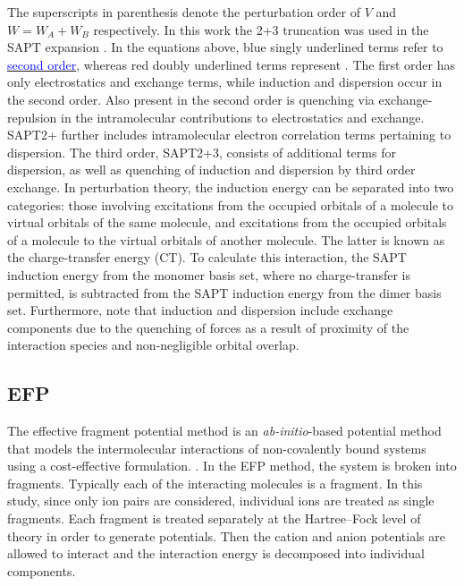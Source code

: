 The superscripts in parenthesis denote the perturbation order of $V$ and $W = W_A + W_B$ respectively. 
In this work the 2+3 truncation was used in the SAPT expansion
\cite{Turney2012a}.
In the equations above, blue singly underlined terms refer to \underline{\textcolor{blue}{second order}}, whereas red doubly underlined terms represent \doubleunderline{\textcolor{red}{third order}}.
The first order has only electrostatics and exchange terms, while induction and dispersion occur in the second order.
Also present in the second order is quenching via exchange-repulsion in the intramolecular contributions to electrostatics and exchange.
SAPT2+ further includes intramolecular electron correlation terms pertaining to dispersion.
The third order, SAPT2+3, consists of additional terms for dispersion, as well as quenching of induction and dispersion by third order exchange.
In perturbation theory, the induction energy can be separated into two categories: those involving excitations from the occupied orbitals of a molecule to virtual orbitals of the same molecule, and excitations from the occupied orbitals of a molecule to the virtual orbitals of another molecule.
\cite{Stone2009a}
The latter is known as the charge-transfer energy (CT).
To calculate this interaction, the SAPT induction energy from the monomer basis set, where no charge-transfer is permitted, is subtracted from the SAPT induction energy from the dimer basis set.
Furthermore, note that induction and dispersion include exchange components due to the quenching of forces as a result of proximity of the interaction species and non-negligible orbital overlap.
\cite{Jeziorski1994a, Hohenstein2010a, Hohenstein2010b, Hohenstein2010c, Hohenstein2011a, Hohenstein2012a}



\subsection{EFP}
The effective fragment potential method is an \emph{ab-initio}-based potential method that models the intermolecular interactions of non-covalently bound systems using a cost-effective formulation.
\cite{Gordon2001a, Gordon2007a, Gordon2009a, Mullin2009a, Ghosh2010a}.
In the EFP method, the system is broken into fragments.
Typically each of the interacting molecules is a fragment. 
In this study, since only ion pairs are considered, individual ions are treated as single fragments. 
Each fragment is treated separately at the Hartree--Fock level of theory in order to generate potentials.
Then the cation and anion potentials are allowed to interact and the interaction energy is decomposed into individual components.


